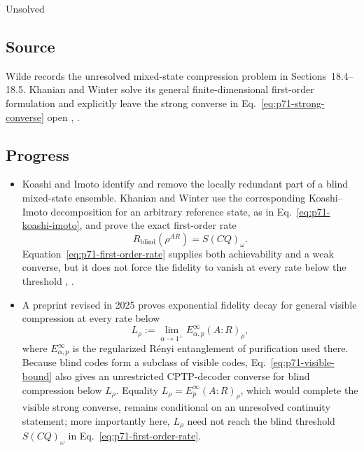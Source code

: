Unsolved

\subsection*{Source}

Wilde records the unresolved mixed-state compression problem in
Sections~18.4--18.5.  Khanian and Winter solve its general finite-dimensional
first-order formulation and explicitly leave the strong converse in
Eq.~\eqref{eq:p71-strong-converse} open
,
.

\subsection*{Progress}

\begin{itemize}
  \item Koashi and Imoto identify and remove the locally redundant part of a
  blind mixed-state ensemble.  Khanian and Winter use the corresponding
  Koashi--Imoto decomposition for an arbitrary reference state, as in
  Eq.~\eqref{eq:p71-koashi-imoto}, and prove the exact first-order rate
  \begin{equation}
    R_{\mathrm{blind}}(\rho^{AR})=S(CQ)_\omega.
    \label{eq:p71-first-order-rate}
  \end{equation}
  Equation~\eqref{eq:p71-first-order-rate} supplies both achievability and a
  weak converse, but it does not force the fidelity to vanish at every rate
  below the threshold
  ,
  .

  \item A preprint revised in 2025 proves exponential fidelity decay for
  general visible compression at every rate below
  \begin{equation}
    L_\rho
    :=\lim_{\alpha\to1^+}E_{\alpha,p}^{\infty}(A{:}R)_\rho,
    \label{eq:p71-visible-bound}
  \end{equation}
  where $E_{\alpha,p}^{\infty}$ is the regularized R\'enyi entanglement of
  purification used there.  Because blind codes form a subclass of visible
  codes, Eq.~\eqref{eq:p71-visible-bound} also gives an unrestricted
  CPTP-decoder converse for blind compression below $L_\rho$.  Equality
  $L_\rho=E_p^\infty(A{:}R)_\rho$, which would complete the visible strong
  converse, remains conditional on an unresolved continuity statement; more
  importantly here, $L_\rho$ need not reach the blind threshold
  $S(CQ)_\omega$ in Eq.~\eqref{eq:p71-first-order-rate}.


\end{itemize}
